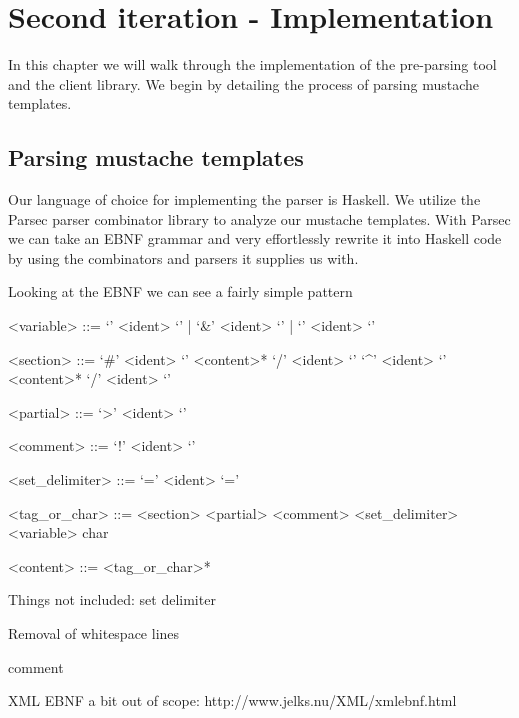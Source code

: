 \chapter{Second iteration - Implementation}

In this chapter we will walk through the implementation of the pre-parsing tool
and the client library. We begin by detailing the process of parsing
mustache templates.

\section{Parsing mustache templates}

Our language of choice for implementing the parser is Haskell.
We utilize the Parsec parser combinator library to analyze our mustache
templates. With Parsec we can take an EBNF grammar and very effortlessly
rewrite it into Haskell code by using the combinators and parsers it supplies
us with.

Looking at the EBNF we can see a fairly simple pattern
\setlength{\grammarparsep}{0.15cm}   %
\setlength{\grammarindent}{4cm}      %

\begin{grammar}
<variable> ::= `{{{' <ident> `}}}' | `{{&' <ident> `}}' | `{{' <ident> `}}'

<section> ::= `{{#' <ident> `}}' <content>* `{{/' <ident> `}}'
\alt `{{^' <ident> `}}' <content>* `{{/' <ident> `}}'

<partial> ::= `{{>' <ident> `}}'

<comment> ::= `{{!' <ident> `}}'

<set\_delimiter> ::= `{{=' <ident> `=}}'

<tag\_or\_char> ::= <section>
\alt <partial>
\alt <comment>
\alt <set\_delimiter>
\alt <variable>
\alt char

<content> ::= <tag\_or\_char>*
\end{grammar}

Things not included:
set delimiter

Removal of whitespace lines

comment

XML EBNF a bit out of scope: http://www.jelks.nu/XML/xmlebnf.html

